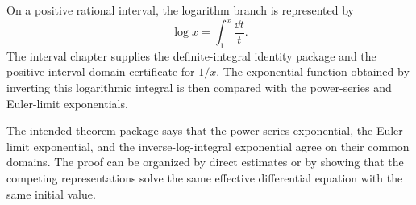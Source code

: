 \begin{definition}
\label{def:log-integral}
On a positive rational interval, the logarithm branch is represented by
\[
  \log x=\int_1^x \frac{\dd t}{t}.
\]
The interval chapter supplies the definite-integral identity package and the
positive-interval domain certificate for \(1/x\).  The exponential function
obtained by inverting this logarithmic integral is then compared with the
power-series and Euler-limit exponentials.
\end{definition}

\begin{definition}
\label{def:exp-representations-agree}
The intended theorem package says that the power-series exponential, the
Euler-limit exponential, and the inverse-log-integral exponential agree on
their common domains.  The proof can be organized by direct estimates or by
showing that the competing representations solve the same effective
differential equation with the same initial value.
\end{definition}
